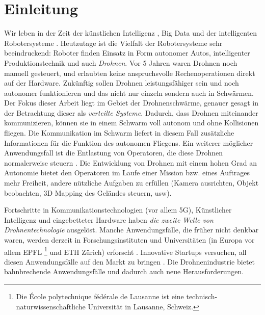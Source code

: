 \chapter{Einleitung}
\label{cha:Einleitung}

Wir leben in der Zeit der künstlichen Intelligenz \cite{MITai}, Big Data \cite{MITbigData, MITbigData2} und der intelligenten Robotersysteme \cite{MITrobots, MITrobots2}. Heutzutage ist die Vielfalt der Robotersysteme sehr beeindruckend: Roboter finden Einsatz in Form autonomer Autos, intelligenter Produktionstechnik und auch \textit{Drohnen}. Vor 5 Jahren waren Drohnen noch manuell gesteuert, und erlaubten keine anspruchsvolle Rechenoperationen direkt auf der Hardware. Zukünftig sollen Drohnen leistungsfähiger sein und noch autonomer funktionieren und das nicht nur einzeln sondern auch in Schwärmen. Der Fokus dieser Arbeit liegt im Gebiet der Drohnenschwärme, genauer gesagt in der Betrachtung dieser als \textit{verteilte Systeme}. Dadurch, dass Drohnen miteinander kommunizieren, können sie in einem Schwarm voll autonom und ohne Kollisionen fliegen. Die Kommunikation im Schwarm liefert in diesem Fall zusätzliche Informationen für die Funktion des autonomen Fliegens. Ein weiterer möglicher Anwendungsfall ist die Entlastung von Operatoren, die diese Drohnen normalerweise steuern \cite{DroneOperator}. Die Entwicklung von Drohnen mit einem hohen Grad an Autonomie bietet den Operatoren im Laufe einer Mission bzw. eines Auftrages mehr Freiheit, andere nützliche Aufgaben zu erfüllen (Kamera ausrichten, Objekt beobachten, 3D Mapping des Geländes steuern, usw).

Fortschritte in Kommunikationstechnologien (vor allem 5G), Künstlicher Intelligenz und eingebetteter Hardware haben \textit{die zweite Welle von Drohnentechnologie} ausgelöst. Manche Anwendungsfälle, die früher nicht denkbar waren, werden derzeit in Forschungsinstituten und Universitäten (in Europa vor allem EPFL  \footnote{Die École polytechnique fédérale de Lausanne ist eine technisch-naturwissenschaftliche Universität in Lausanne, Schweiz.} und ETH Zürich) erforscht \cite{EPFLdrones}. Innovative Startups versuchen, all diesen Anwendungsfälle auf den Markt zu bringen \cite{EPFLdrones}. Die Drohnenindustrie bietet bahnbrechende Anwendungsfälle und dadurch auch neue Herausforderungen.

